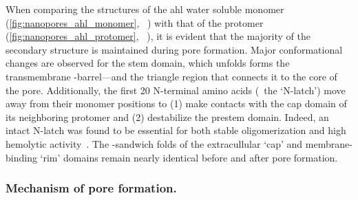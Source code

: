 When comparing the structures of the \gls{ahl} water soluble monomer (\cref{fig:nanopores_ahl_monomer},
~\cite{Sugawara-2015}) with that of the protomer (\cref{fig:nanopores_ahl_protomer},
~\cite{Song-1996}), it is evident that the majority of the secondary structure is maintained
during pore formation. Major conformational changes are observed for the stem domain, which unfolds forms the
transmembrane \tb-barrel---and the triangle region that connects it to the core of the pore. Additionally, the
first 20 N-terminal amino acids (\ie~the `N-latch') move away from their monomer positions to (1) make
contacts with the cap domain of its neighboring protomer and (2) destabilize the prestem domain. Indeed, an
intact N-latch was found to be essential for both stable oligomerization and high hemolytic
activity~\cite{Song-1996}. The \tb-sandwich folds of the extracullular `cap' and membrane-binding `rim'
domains remain nearly identical before and after pore formation.

\subsubsection{Mechanism of pore formation.}
%

